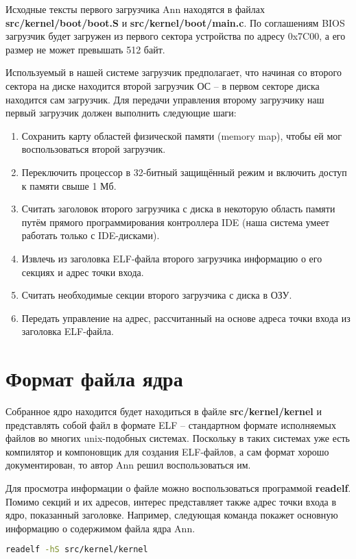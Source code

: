 Исходные тексты первого загрузчика Ann находятся в файлах \textbf{src/kernel/boot/boot.S}
и \textbf{src/kernel/boot/main.c}. По соглашениям BIOS загрузчик будет загружен из первого
сектора устройства по адресу 0x7C00, а его размер не может превышать 512 байт.

Используемый в нашей системе загрузчик предполагает, что начиная со второго сектора
на диске находится второй загрузчик ОС -- в первом секторе диска находится сам загрузчик.
Для передачи управления второму загрузчику наш первый загрузчик должен
выполнить следующие шаги:
\begin{enumerate}
\item Сохранить карту областей физической памяти (memory map), чтобы ей мог воспользоваться второй загрузчик.
\item Переключить процессор в 32-битный защищённый режим и включить доступ к памяти свыше 1 Мб.
\item Считать заголовок второго загрузчика с диска в некоторую область памяти путём прямого программирования
контроллера IDE (наша система умеет работать только с IDE-дисками).
\item Извлечь из заголовка ELF-файла второго загрузчика информацию о его секциях и адрес точки входа.
\item Считать необходимые секции второго загрузчика с диска в ОЗУ.
\item Передать управление на адрес, рассчитанный на основе адреса точки входа из заголовка ELF-файла.
\end{enumerate}

\section{Формат файла ядра}
Собранное ядро находится будет находиться в файле \textbf{src/kernel/kernel} и
представлять собой файл в формате ELF -- стандартном формате исполняемых файлов во многих
unix-подобных системах. Поскольку в таких системах уже
есть компилятор и компоновщик для создания ELF-файлов, а сам формат
хорошо документирован, то автор Ann решил воспользоваться им.

Для просмотра информации о файле можно воспользоваться программой \textbf{readelf}.
Помимо секций и их адресов, интерес представляет также адрес точки входа в ядро,
показанный заголовке. Например, следующая команда покажет основную информацию
о содержимом файла ядра Ann.

\begin{lstlisting}[language=bash]
readelf -hS src/kernel/kernel
\end{lstlisting}

